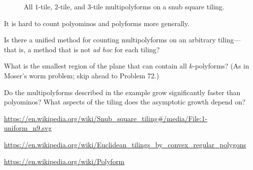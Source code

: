 \documentclass{article}
\begin{document}
\begin{figure}[ht!]
  \caption{
    All $1$-tile, $2$-tile, and $3$-tile multipolyforms on a snub square tiling.
  }
\end{figure}
\begin{note}
  It is hard to count polyominos and polyforms more generally.
\end{note}
\begin{question}
  Is there a unified method for counting multipolyforms on an arbitrary
  tiling---that is, a method that is not \textit{ad hoc} for each tiling?
\end{question}

\begin{related}
  \item What is the smallest region of the plane that can contain all
  $k$-polyforms? (As in Moser's worm problem; skip ahead to Problem 72.)
  \item Do the multipolyforms described in the example grow significantly
  faster than polyominos? What aspects of the tiling does the asymptotic growth
  depend on?
\end{related}
\begin{references}
  \item \url{https://en.wikipedia.org/wiki/Snub_square_tiling#/media/File:1-uniform_n9.svg}
  \item \url{https://en.wikipedia.org/wiki/Euclidean_tilings_by_convex_regular_polygons}
  \item \url{https://en.wikipedia.org/wiki/Polyform}
\end{references}
\end{document}
